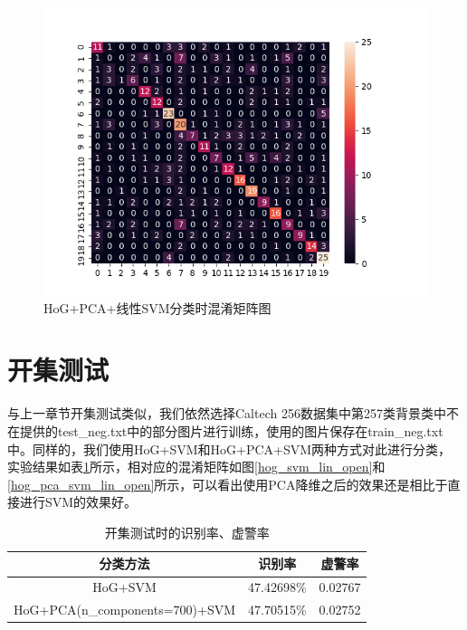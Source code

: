 \documentclass[cn]{elegantbook}
\begin{document}
\begin{figure}[!h]
	\centering
	\includegraphics[width=\linewidth]{../results/hog_pca_svm_lin}
	\caption{\label{hog_pca_svm_lin}HoG+PCA+线性SVM分类时混淆矩阵图}
\end{figure}

\section{开集测试}
与上一章节开集测试类似，我们依然选择Caltech 256数据集中第257类背景类中不在提供的test\_neg.txt中的部分图片进行训练，使用的图片保存在train\_neg.txt中。同样的，我们使用HoG+SVM和HoG+PCA+SVM两种方式对此进行分类，实验结果如表\ref{hog_res2}所示，相对应的混淆矩阵如图\ref{hog_svm_lin_open}和\ref{hog_pca_svm_lin_open}所示，可以看出使用PCA降维之后的效果还是相比于直接进行SVM的效果好。

\begin{table}[!h]
	\centering
	\caption{\label{hog_res2}开集测试时的识别率、虚警率}
	\begin{tabular}{|c|c|c|}
		\hline
		分类方法 & 识别率 & 虚警率 \\
		\hline
		HoG+SVM & 47.42698\% & 0.02767 \\
		\hline
		HoG+PCA(n\_components=700)+SVM & 47.70515\% & 0.02752 \\
		\hline
	\end{tabular}
\end{table}
\end{document}

